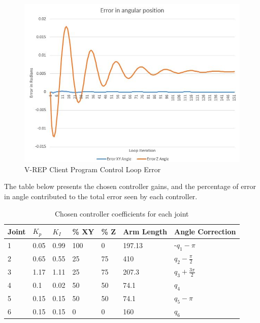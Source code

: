 \documentclass[12pt,openany,a4paper]{book}
\begin{document}
\begin{center}
\begin{figure}[htb]
  \includegraphics[width=1\linewidth]{control_loop_error.jpg}
\caption{V-REP Client Program Control Loop Error}
\end{figure}
\end{center}


The table below presents the chosen controller gains, and the percentage of error in angle contributed to the total error seen by each controller.

\begin{center}
\begin{table}[htb]


    \begin{tabular}{| p{1.2cm} | p{2cm} | p{2cm} | p{2cm} | p{2cm} | p{2cm} | p{2cm} |}
    \hline
    Joint & $K_p$ & $K_I$ & \% XY & \% Z & Arm Length & Angle Correction \\ \hline
     1 & 0.05	& 0.99	& 100	& 0		& 197.13 &	-$q_1 - \pi$ \\ \hline
     2 & 0.65	& 0.55	& 25	& 75	& 410 	&	$q_2 - \frac{\pi}{2}$  \\ \hline
     3 & 1.17	& 1.11	& 25	& 75	& 207.3 &	$q_3 + \frac{3 \pi}{2}$ \\ \hline
     4 & 0.1	& 0.02	& 50	& 50	& 74.1	& $q_4$ \\ \hline
     5 & 0.15	& 0.15	& 50	& 50 	& 74.1	& $q_5 - \pi$ \\ \hline
     6 & 0.15	& 0.15	& 0		& 0 	& 160 	& $q_6$ \\ \hline
    \end{tabular}
    \caption{Chosen controller coefficients for each joint}
\end{table}
\end{center}
\end{document}
